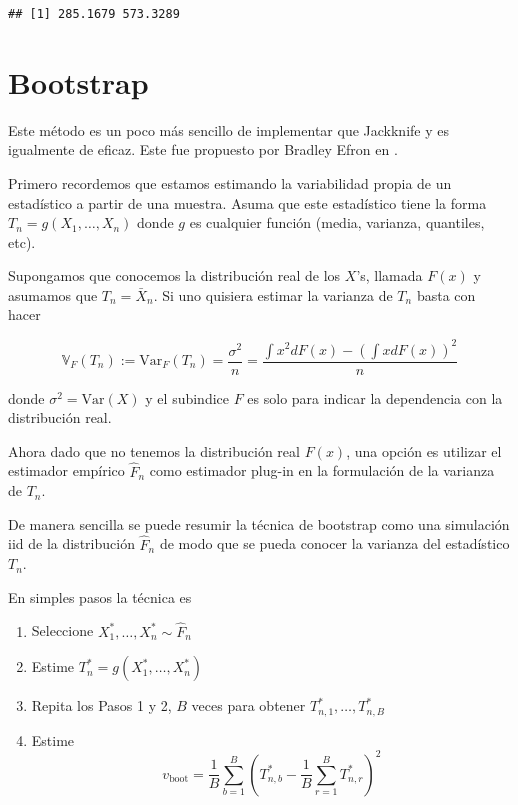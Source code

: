 \documentclass[
  12pt,
]{book}
\providecommand{\tightlist}{%
  \setlength{\itemsep}{0pt}\setlength{\parskip}{0pt}}
\theoremstyle{definition}
\theoremstyle{definition}
\theoremstyle{definition}
\theoremstyle{definition}
\theoremstyle{remark}
\begin{document}
\begin{verbatim}
## [1] 285.1679 573.3289
\end{verbatim}

\hypertarget{bootstrap}{%
\section{Bootstrap}\label{bootstrap}}

Este método es un poco más sencillo de implementar que Jackknife y es
igualmente de eficaz. Este fue propuesto por Bradley Efron en \autocite{Efron1979}.

Primero recordemos que estamos estimando la variabilidad propia de un estadístico a partir de
una muestra. Asuma que este estadístico tiene la forma \(T_{n}=g\left( X_{1},\ldots,X_{n} \right)\)
donde \(g\) es cualquier función (media, varianza, quantiles, etc).

Supongamos que conocemos la distribución real de los \(X\)'s, llamada \(F(x)\) y asumamos que \(T_n=\bar X_n\). Si uno
quisiera estimar la varianza de \(T_n\) basta con hacer

\begin{equation*}
\mathbb{V}_{F}\left(T_{n}\right):=\mathrm{Var}_{F}\left(T_{n}\right)
= \frac{\sigma^{2}}{n}=\frac{\int x^{2}  dF(x)-\left(\int x
dF(x)\right)^{2}}{n}
\end{equation*}

donde \(\sigma^{2} = \mathrm{Var}\left(X\right)\) y el subindice \(F\) es solo para indicar la dependencia con la distribución real.

Ahora dado que no tenemos la distribución real \(F(x)\), una opción es utilizar el estimador empírico \(\hat{F}_n\) como estimador plug-in en la formulación de la varianza de \(T_n\).

De manera sencilla se puede resumir la técnica de bootstrap como una simulación iid de la distribución \(\hat{F}_n\) de modo que se pueda conocer la varianza del estadístico \(T_n\).

En simples pasos la técnica es

\begin{enumerate}
\def\labelenumi{\arabic{enumi}.}
\tightlist
\item
  Seleccione \(X_{1}^{*}, \ldots, X_{n}^{*} \sim \widehat{F}_{n}\)
\item
  Estime \(T_{n}^{*}=g\left(X_{1}^{*}, \ldots, X_{n}^{*}\right)\)
\item
  Repita los Pasos 1 y 2, \(B\) veces para obtener \(T_{n, 1}^{*}, \ldots, T_{n, B}^{*}\)
\item
  Estime
  \[
  v_{\mathrm{boot}}=\frac{1}{B} \sum_{b=1}^{B}\left(T_{n, b}^{*}-\frac{1}{B} \sum_{r=1}^{B} T_{n, r}^{*}\right)^{2}
  \]
\end{enumerate}
\end{document}
